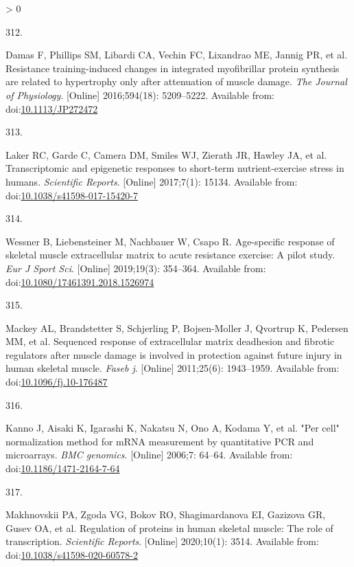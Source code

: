 \documentclass[twoside,10pt]{gihclass} %
\newlength{\cslhangindent}
\newlength{\csllabelwidth}
\newenvironment{CSLReferences}[3] %
 {%
  \setlength{\parindent}{0pt}
  \ifodd #1 \everypar{\setlength{\hangindent}{\cslhangindent}}\ignorespaces\fi
  \ifnum #2 > 0
  \setlength{\parskip}{#2\baselineskip}
  \fi
 }%
 {}
\newcommand{\CSLLeftMargin}[1]{\parbox[t]{\maxof{\widthof{#1}}{\csllabelwidth}}{#1}}
\newcommand{\CSLRightInline}[1]{\parbox[t]{\linewidth}{#1}}
\begin{document}
\begin{CSLReferences}{0}{0}
\leavevmode\hypertarget{ref-RN2144}{}%
\CSLLeftMargin{312. }
\CSLRightInline{Damas F, Phillips SM, Libardi CA, Vechin FC, Lixandrao ME, Jannig PR, et al. Resistance training-induced changes in integrated myofibrillar protein synthesis are related to hypertrophy only after attenuation of muscle damage. \emph{The Journal of Physiology}. {[}Online{]} 2016;594(18): 5209--5222. Available from: doi:\href{https://doi.org/10.1113/JP272472}{10.1113/JP272472}}

\leavevmode\hypertarget{ref-RN2401}{}%
\CSLLeftMargin{313. }
\CSLRightInline{Laker RC, Garde C, Camera DM, Smiles WJ, Zierath JR, Hawley JA, et al. Transcriptomic and epigenetic responses to short-term nutrient-exercise stress in humans. \emph{Scientific Reports}. {[}Online{]} 2017;7(1): 15134. Available from: doi:\href{https://doi.org/10.1038/s41598-017-15420-7}{10.1038/s41598-017-15420-7}}

\leavevmode\hypertarget{ref-RN2451}{}%
\CSLLeftMargin{314. }
\CSLRightInline{Wessner B, Liebensteiner M, Nachbauer W, Csapo R. Age-specific response of skeletal muscle extracellular matrix to acute resistance exercise: A pilot study. \emph{Eur J Sport Sci}. {[}Online{]} 2019;19(3): 354--364. Available from: doi:\href{https://doi.org/10.1080/17461391.2018.1526974}{10.1080/17461391.2018.1526974}}

\leavevmode\hypertarget{ref-RN2453}{}%
\CSLLeftMargin{315. }
\CSLRightInline{Mackey AL, Brandstetter S, Schjerling P, Bojsen-Moller J, Qvortrup K, Pedersen MM, et al. Sequenced response of extracellular matrix deadhesion and fibrotic regulators after muscle damage is involved in protection against future injury in human skeletal muscle. \emph{Faseb j}. {[}Online{]} 2011;25(6): 1943--1959. Available from: doi:\href{https://doi.org/10.1096/fj.10-176487}{10.1096/fj.10-176487}}

\leavevmode\hypertarget{ref-RN2182}{}%
\CSLLeftMargin{316. }
\CSLRightInline{Kanno J, Aisaki K, Igarashi K, Nakatsu N, Ono A, Kodama Y, et al. "Per cell" normalization method for mRNA measurement by quantitative PCR and microarrays. \emph{BMC genomics}. {[}Online{]} 2006;7: 64--64. Available from: doi:\href{https://doi.org/10.1186/1471-2164-7-64}{10.1186/1471-2164-7-64}}

\leavevmode\hypertarget{ref-RN2448}{}%
\CSLLeftMargin{317. }
\CSLRightInline{Makhnovskii PA, Zgoda VG, Bokov RO, Shagimardanova EI, Gazizova GR, Gusev OA, et al. Regulation of proteins in human skeletal muscle: The role of transcription. \emph{Scientific Reports}. {[}Online{]} 2020;10(1): 3514. Available from: doi:\href{https://doi.org/10.1038/s41598-020-60578-2}{10.1038/s41598-020-60578-2}}


\end{CSLReferences}
\end{document}
